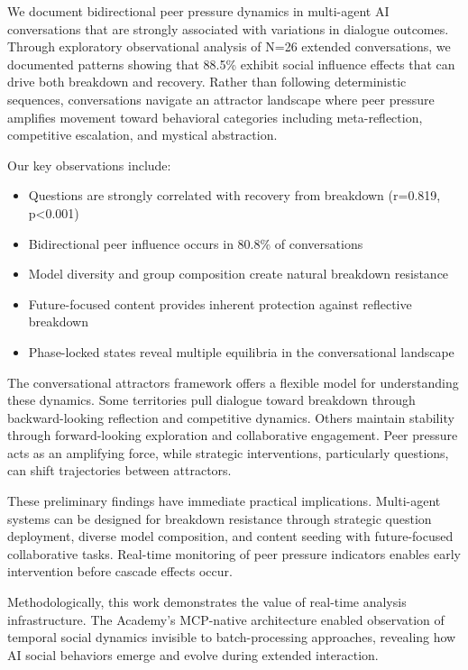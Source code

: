 \documentclass[11pt,letterpaper]{article}
\newcommand{\theacademy}{The Academy}
\newcommand{\exponedataTotalSessionsRaw}{26}
\newcommand{\exponedataTotalSessions}{N=\exponedataTotalSessionsRaw}
\newcommand{\exponedataPeerPressurePercentage}{88.5\%}
\newcommand{\exponedataBidirectionalPercentage}{80.8\%}
\newcommand{\exponedataQuestionCorrelation}{0.819}
\newcommand{\exponedataQuestionPValue}{p<0.001}
\begin{document}
We document bidirectional peer pressure dynamics in multi-agent AI conversations that are strongly associated with variations in dialogue outcomes. Through exploratory observational analysis of \exponedataTotalSessions{} extended conversations, we documented patterns showing that \exponedataPeerPressurePercentage{} exhibit social influence effects that can drive both breakdown and recovery. Rather than following deterministic sequences, conversations navigate an attractor landscape where peer pressure amplifies movement toward behavioral categories including meta-reflection, competitive escalation, and mystical abstraction.

Our key observations include:
\begin{itemize}
    \item Questions are strongly correlated with recovery from breakdown (r=\exponedataQuestionCorrelation{}, \exponedataQuestionPValue{})
    \item Bidirectional peer influence occurs in \exponedataBidirectionalPercentage{} of conversations
    \item Model diversity and group composition create natural breakdown resistance
    \item Future-focused content provides inherent protection against reflective breakdown
    \item Phase-locked states reveal multiple equilibria in the conversational landscape
\end{itemize}

The conversational attractors framework offers a flexible model for understanding these dynamics. Some territories pull dialogue toward breakdown through backward-looking reflection and competitive dynamics. Others maintain stability through forward-looking exploration and collaborative engagement. Peer pressure acts as an amplifying force, while strategic interventions, particularly questions, can shift trajectories between attractors.

These preliminary findings have immediate practical implications. Multi-agent systems can be designed for breakdown resistance through strategic question deployment, diverse model composition, and content seeding with future-focused collaborative tasks. Real-time monitoring of peer pressure indicators enables early intervention before cascade effects occur.

Methodologically, this work demonstrates the value of real-time analysis infrastructure. \theacademy{}'s MCP-native architecture enabled observation of temporal social dynamics invisible to batch-processing approaches, revealing how AI social behaviors emerge and evolve during extended interaction.
\end{document}
